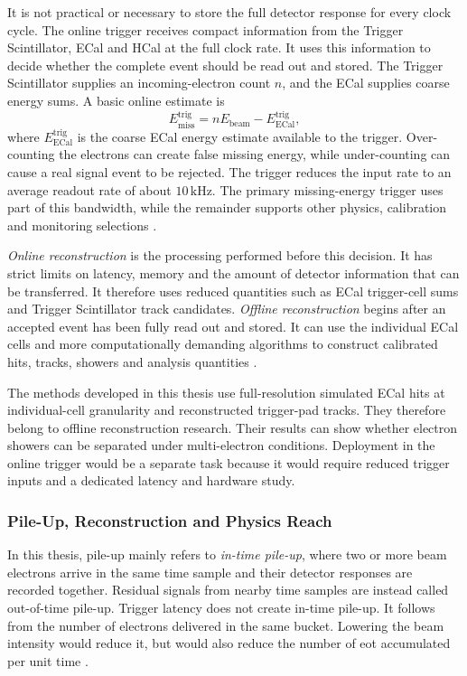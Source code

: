 It is not practical or necessary to store the full detector response for
every clock cycle. The online trigger receives compact information from the
Trigger Scintillator, ECal and HCal at the full clock rate. It uses this
information to decide whether the complete event should be read out and
stored. The Trigger Scintillator supplies an incoming-electron count \(n\),
and the ECal supplies coarse energy sums. A basic online estimate is
\begin{equation}
    E_{\mathrm{miss}}^{\mathrm{trig}}
    =
    nE_{\mathrm{beam}} - E_{\mathrm{ECal}}^{\mathrm{trig}} ,
\end{equation}
where \(E_{\mathrm{ECal}}^{\mathrm{trig}}\) is the coarse ECal energy estimate
available to the trigger.
Over-counting the electrons can create false missing energy, while
under-counting can cause a real signal event to be rejected. The trigger
reduces the input rate to an average readout rate of about
\(10\,\mathrm{kHz}\). The primary missing-energy trigger uses part of this
bandwidth, while the remainder supports other physics, calibration and
monitoring selections \cite{ldmx2025-overview}.

\emph{Online reconstruction} is the processing performed before this
decision. It has strict limits on latency, memory and the amount of detector
information that can be transferred. It therefore uses reduced quantities
such as ECal trigger-cell sums and Trigger Scintillator track candidates.
\emph{Offline reconstruction} begins after an accepted event has been fully
read out and stored. It can use the individual ECal cells and more
computationally demanding algorithms to construct calibrated hits, tracks,
showers and analysis quantities \cite{ldmx2025-overview}.

The methods developed in this thesis use full-resolution simulated ECal hits
at individual-cell granularity and reconstructed trigger-pad tracks. They
therefore belong to offline reconstruction research. Their results can show
whether electron showers can be separated under multi-electron conditions.
Deployment in the online trigger would be a separate task because it would
require reduced trigger inputs and a dedicated latency and hardware study.

\subsubsection{Pile-Up, Reconstruction and Physics Reach}
\label{sec:formalism}

In this thesis, \gls{pile-up} mainly refers to \emph{in-time pile-up}, where
two or more beam electrons arrive in the same time sample and their detector
responses are recorded together. Residual signals from nearby time samples
are instead called out-of-time pile-up. Trigger latency does not create
in-time pile-up. It follows from the number of electrons delivered in the
same bucket. Lowering the beam intensity would reduce it, but would also
reduce the number of \gls{eot} accumulated per unit time
\cite{ldmx2025-overview}.

